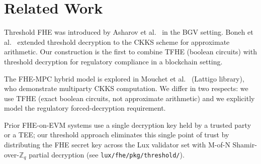 \section{Related Work}

\label{sec:related}

Threshold FHE was introduced by Asharov et al.~\cite{asharov2012}
in the BGV setting.  Boneh et al.~\cite{boneh2018} extended threshold
decryption to the CKKS scheme for approximate arithmetic.  Our
construction is the first to combine TFHE (boolean circuits) with
threshold decryption for regulatory compliance in a blockchain
setting.

The FHE-MPC hybrid model is explored in Mouchet et
al.~\cite{mouchet2021} (Lattigo library), who demonstrate multiparty
CKKS computation.  We differ in two respects: we use TFHE (exact
boolean circuits, not approximate arithmetic) and we explicitly model
the regulatory forced-decryption requirement.

Prior FHE-on-EVM systems use a single decryption key held by a trusted
party or a TEE; our threshold approach eliminates this single point of
trust by distributing the FHE secret key across the Lux validator set
with M-of-N Shamir-over-$\mathbb{Z}_q$ partial decryption (see
\texttt{lux/fhe/pkg/threshold/}).

